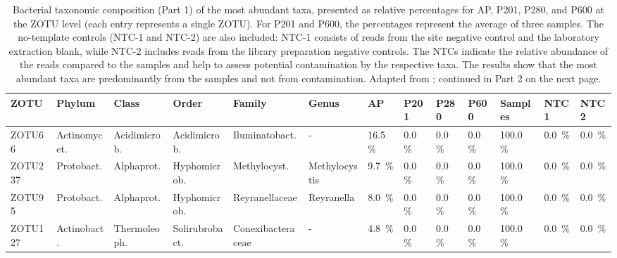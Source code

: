 \begin{table}
\centering
\begin{adjustbox}{max width=0.7\textwidth, max totalheight=0.85\textheight, keepaspectratio}
\renewcommand{\arraystretch}{1.5} %
\footnotesize %
\caption{Bacterial taxonomic composition (Part 1) of the most abundant taxa, presented as relative percentages for AP, P201, P280, and P600 at the ZOTU level (each entry represents a single ZOTU).
For P201 and P600, the percentages represent the average of three samples.
The no-template controls (NTC-1 and NTC-2) are also included: NTC-1 consists of reads from the site negative control and the laboratory extraction blank, while NTC-2 includes reads from the library preparation negative controls.
The NTCs indicate the relative abundance of the reads compared to the samples and help to assess potential contamination by the respective taxa.
The results show that the most abundant taxa are predominantly from the samples and not from contamination.
Adapted from \cite{giroud2025microbio}; continued in Part 2 on the next page.}
\label{tabSI:tax_bac_1}
\begin{tabular}{llllllllll||lll}
\toprule
\textbf{ZOTU} & \textbf{Phylum} & \textbf{Class} & \textbf{Order} & \textbf{Family} & \textbf{Genus} & \textbf{AP} & \textbf{P201} & \textbf{P280} & \textbf{P600} & \textbf{Samples} & \textbf{NTC1} & \textbf{NTC2} \\
\midrule
ZOTU66  & Actinomycet.   & Acidimicrob.   & Acidimicrob.   & Iluminatobact.   & -            & \SI{16.5}{\percent}  & \SI{0.0}{\percent}  & \SI{0.0}{\percent}  & \SI{0.0}{\percent}  & \SI{100.0}{\percent} & \SI{0.0}{\percent}  & \SI{0.0}{\percent} \\
ZOTU237 & Protobact.     & Alphaprot.     & Hyphomicrob.   & Methylocyst.     & Methylocystis & \SI{9.7}{\percent}   & \SI{0.0}{\percent}  & \SI{0.0}{\percent}  & \SI{0.0}{\percent}  & \SI{100.0}{\percent} & \SI{0.0}{\percent}  & \SI{0.0}{\percent} \\
ZOTU95  & Protobact.     & Alphaprot.     & Hyphomicrob.   & Reyranellaceae   & Reyranella    & \SI{8.0}{\percent}   & \SI{0.0}{\percent}  & \SI{0.0}{\percent}  & \SI{0.0}{\percent}  & \SI{100.0}{\percent} & \SI{0.0}{\percent}  & \SI{0.0}{\percent} \\
ZOTU127 & Actinobact.    & Thermoleoph.   & Solirubrobact. & Conexibacteraceae & -            & \SI{4.8}{\percent}   & \SI{0.0}{\percent}  & \SI{0.0}{\percent}  & \SI{0.0}{\percent}  & \SI{100.0}{\percent} & \SI{0.0}{\percent}  & \SI{0.0}{\percent} \\

\end{tabular}
\end{adjustbox}
\end{table}
